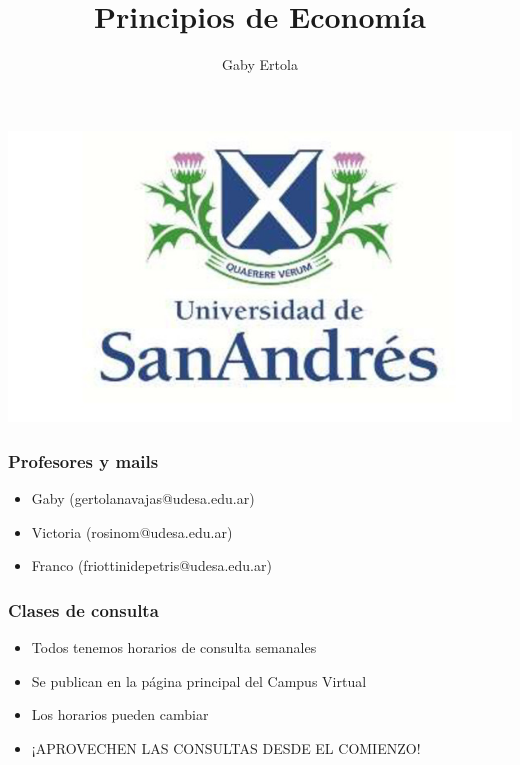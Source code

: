 \documentclass{beamer}
\title[Principios de Economía]{Principios de Economía}
\date{}
\author[Ertola]{Gaby Ertola }
\institute[]{Universidad de San Andrés \\
2023}
\begin{document}
\begin{frame}
\titlepage
\centering
\includegraphics[scale=0.25]{Slides Principios de Economia/Figures/logoUDESA.jpg} 
\end{frame}

\begin{frame}
\frametitle{Profesores y mails}
\begin{itemize}
    \item Gaby (gertolanavajas@udesa.edu.ar) \vspace{2mm}
    \item Victoria (rosinom@udesa.edu.ar) \vspace{2mm}
    \item Franco (friottinidepetris@udesa.edu.ar)
\end{itemize}
\end{frame}

\begin{frame}
\frametitle{Clases de consulta}
\begin{itemize}
    \item Todos tenemos horarios de consulta semanales \vspace{2mm}
    \item Se publican en la página principal del Campus Virtual \vspace{2mm}
    \item Los horarios pueden cambiar \vspace{2mm}
    \item ¡APROVECHEN LAS CONSULTAS DESDE EL COMIENZO!
\end{itemize}
\end{frame}
\end{document}
